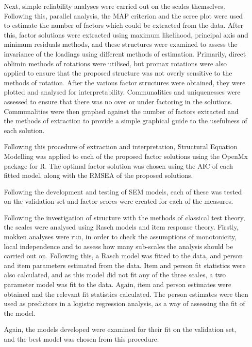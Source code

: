 Next, simple reliability analyses were carried out on the scales themselves. Following this, parallel analysis, the MAP criterion and the scree plot were used to estimate the number of factors which could be extracted from the data. After this, factor solutions were extracted using maximum likelihood, principal axis and minimum residuals methods, and these structures were examined to assess the invariance of the loadings using different methods of estimation. Primarily, direct oblimin methods of rotations were utilised, but promax rotations were also applied to ensure that the proposed structure was not overly sensitive to the methods of rotation. After the various factor structures were obtained, they were plotted and analysed for interpretability. Communalities and uniquenesses were assessed to ensure that there was no over or under factoring in the solutions. Communalities were then graphed against the number of factors extracted and the methods of extraction to provide a simple graphical guide to the usefulness of each solution. 

Following this procedure of extraction and interpretation, Structural Equation Modelling was applied to each of the proposed factor solutions using the OpenMx package for R. The optimal factor solution was chosen using the AIC of each fitted model, along with the RMSEA of the proposed solutions.

Following the development and testing of SEM models, each of these was tested on the validation set and factor scores were created for each of the measures. 

Following the investigation of structure with the methods of classical test theory, the scales were analysed using Rasch models and item response theory. Firstly, mokken analyses were run, in order to check the assumptions of monotonicity, local independence and to assess how many sub-scales the analysis should be carried out on. Following this, a Rasch model was fitted to the data, and person and item parameters estimated from the data. Item and person fit statistics were also calculated, and as this model did not fit any of the three scales, a two parameter model was fit to the data. Again, item and person estimates were obtained and the relevant fit statistics calculated. The person estimates were then used as predictors in a logistic regression analysis, as a way of assessing the fit of the model.

Again, the models developed were examined for their fit on the validation set, and the best model was chosen from this procedure. 

